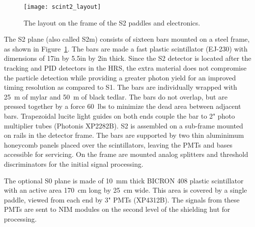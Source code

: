 \begin{figure}[tbh]
  \begin{center}
    \texttt{[image: scint2\_layout]}
    \caption[Detectors: S2 Layout]{The layout on the frame of the S2 paddles and
    electronics.}
    \label{fig:s2layout}
  \end{center}
\end{figure}

The S2 plane (also called S2m) consists of sixteen bars mounted on a steel
frame, as shown in Figure~\ref{fig:s2layout}. The bars are made a fast
plastic scintillator (EJ-230) with dimensions of 17\unit{in} by
5.5\unit{in} by 2\unit{in} thick. Since the S2 detector is located after
the tracking and PID detectors in the HRS, the extra material does not
compromise the particle detection while providing a greater photon yield
for an improved timing resolution as compared to S1. The bars are
individually wrapped with 25\unit{\mu m} of mylar and 50\unit{\mu m} of
black tedlar. The bars do not overlap, but are pressed together by a force
60~lbs to minimize the dead area between adjacent bars. Trapezoidal lucite
light guides on both ends couple the bar to 2" photo multiplier tubes
(Photonis XP2282B). S2 is assembled on a sub-frame mounted on rails in the
detector frame. The bars are supported by two thin aluminimum honeycomb
panels placed over the scintillators, leaving the PMTs and bases accessible
for servicing. On the frame are mounted analog splitters and threshold
discriminators for the initial signal processing.

The optional S0 plane is made of 10~mm thick BICRON 408 plastic
scintillator with an active area 170~cm long by 25~cm wide. This area is
covered by a single paddle, viewed from each end by 3" PMTs (XP4312B). The
signals from these PMTs are sent to NIM modules on the second level of
the shielding hut for processing.

